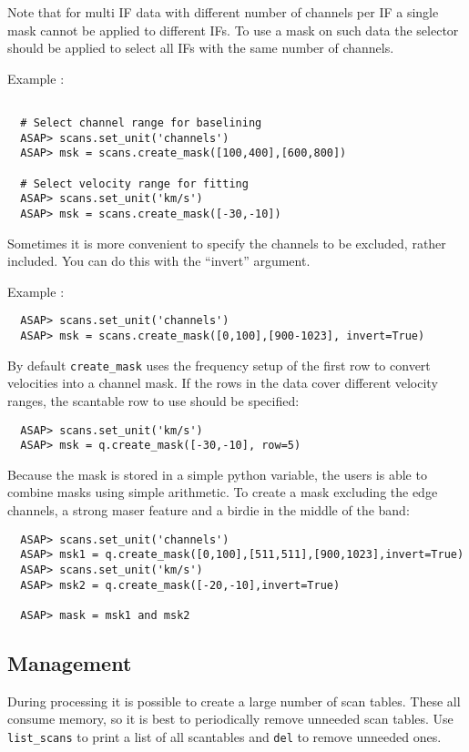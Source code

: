 \documentclass[11pt]{article}
\newcommand{\cmd}[1]{{\tt #1}}
\begin{document}
Note that for multi IF data with different number of channels per IF a
single mask cannot be applied to different IFs. To use a mask on such
data the selector should be applied to select all IFs with the same
number of channels.

Example :
\begin{verbatim}

  # Select channel range for baselining
  ASAP> scans.set_unit('channels')
  ASAP> msk = scans.create_mask([100,400],[600,800])

  # Select velocity range for fitting
  ASAP> scans.set_unit('km/s')
  ASAP> msk = scans.create_mask([-30,-10])
\end{verbatim}

Sometimes it is more convenient to specify the channels to be
excluded, rather included.  You can do this with the ``invert''
argument.

Example :
\begin{verbatim}
  ASAP> scans.set_unit('channels')
  ASAP> msk = scans.create_mask([0,100],[900-1023], invert=True)
\end{verbatim}

By default \cmd{create\_mask} uses the frequency setup of the first row
to convert velocities into a channel mask. If the rows in the data
cover different velocity ranges, the scantable row to use should be
specified:

\begin{verbatim}
  ASAP> scans.set_unit('km/s')
  ASAP> msk = q.create_mask([-30,-10], row=5)
\end{verbatim}

Because the mask is stored in a simple python variable, the users is
able to combine masks using simple arithmetic. To create a mask
excluding the edge channels, a strong maser feature and a birdie in
the middle of the band:

\begin{verbatim}
  ASAP> scans.set_unit('channels')
  ASAP> msk1 = q.create_mask([0,100],[511,511],[900,1023],invert=True)
  ASAP> scans.set_unit('km/s')
  ASAP> msk2 = q.create_mask([-20,-10],invert=True)

  ASAP> mask = msk1 and msk2
\end{verbatim}


\subsection{Management}

During processing it is possible to create
a large number of scan tables. These all consume memory, so it is best
to periodically remove unneeded scan tables. Use \cmd{list\_scans} to
print a list of all scantables and \cmd{del} to remove unneeded ones.
\end{document}
